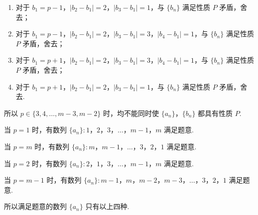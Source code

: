\begin{solution}
\begin{enumerate}
\begin{enumerate}
\item 对于 \(b_1=p-1\)，\(|b_2-b_1|=2\)，\(|b_3-b_1|=1\)，与 \(\{b_n\}\) 满足性质 \(P\) 矛盾，舍去；

\item 对于 \(b_1=p-1\)，\(|b_2-b_1|=2\)，\(|b_3-b_1|=3\)，\(|b_4-b_1|=1\)，与 \(\{b_n\}\) 满足性质 \(P\) 矛盾，舍去；

\item 对于 \(b_1=p+1\)，\(|b_2-b_1|=2\)，\(|b_3-b_1|=3\)，\(|b_4-b_1|=1\)，与 \(\{b_n\}\) 满足性质 \(P\) 矛盾，舍去；

\item 对于 \(b_1=p+1\)，\(|b_2-b_1|=2\)，\(|b_3-b_1|=1\)，与 \(\{b_n\}\) 满足性质 \(P\) 矛盾，舍去.
\end{enumerate}

所以 \(p\in\{3,4,\ldots,m-3,m-2\}\) 时，均不能同时使 \(\{a_n\}\)，\(\{b_n\}\) 都具有性质 \(P\).

当 \(p=1\) 时，有数列 \(\{a_n\}:1\)，\(2\)，\(3\)，\(\ldots\)，\(m-1\)，\(m\) 满足题意.

当 \(p=m\) 时，有数列 \(\{a_n\}:m\)，\(m-1\)，\(\ldots\)，\(3\)，\(2\)，\(1\) 满足题意.

当 \(p=2\) 时，有数列 \(\{a_n\}:2\)，\(1\)，\(3\)，\(\ldots\)，\(m-1\)，\(m\) 满足题意.

当 \(p=m-1\) 时，有数列 \(\{a_n\}:m-1\)，\(m\)，\(m-2\)，\(m-3\)，\(\ldots\)，\(3\)，\(2\)，\(1\) 满足题意.

所以满足题意的数列 \(\{a_n\}\) 只有以上四种.
\end{enumerate}
\end{solution}
